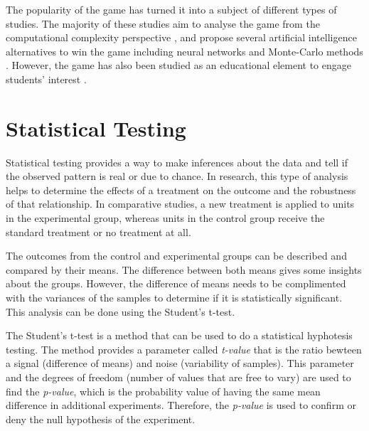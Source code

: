 The popularity of the game has turned it into a subject of different types of studies. The majority of these studies aim to analyse the game from the computational complexity perspective \citep{abdelkader20162048}, and propose several artificial intelligence alternatives to win the game including neural networks \citep{boris2016evolving} and Monte-Carlo methods \citep{rodgers2014investigation}. However, the game has also been studied as an educational element to engage students' interest \citep{neller2015pedagogical}.

\section{Statistical Testing}
\label{stat-testing}
Statistical testing provides a way to make inferences about the data and tell if the observed pattern is real or due to chance. In research, this type of analysis helps to determine the effects of a treatment on the outcome and the robustness of that relationship. In comparative studies, a new treatment is applied to units in the experimental group, whereas units in the control group receive the standard treatment or no treatment at all.

The outcomes from the control and experimental groups can be described and compared by their means. The difference between both means gives some insights about the groups. However, the difference of means needs to be complimented with the variances of the samples to determine if it is statistically significant. This analysis can be done using the Student's t-test.

The Student's t-test is a method that can be used to do a statistical hyphotesis testing. The method provides a parameter called \textit{t-value} that is the ratio bewteen a signal (difference of means) and noise (variability of samples). This parameter and the degrees of freedom (number of values that are free to vary) are used to find the \textit{p-value}, which is the probability value of having the same mean difference in additional experiments. Therefore, the \textit{p-value} is used to confirm or deny the null hypothesis of the experiment.

